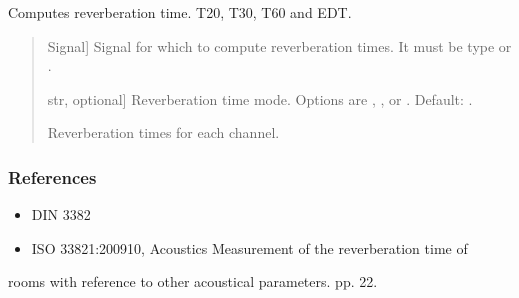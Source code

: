 \documentclass[letterpaper,10pt,english]{sphinxmanual}
\begin{document}
\begin{fulllineitems}
\label{\detokenize{modules/dsptools.room_acoustics:dsptools.room_acoustics.reverb_time}}
\pysigstartsignatures
{}
\pysigstopsignatures
\sphinxAtStartPar
Computes reverberation time. T20, T30, T60 and EDT.
\begin{quote}\begin{description}
\begin{description}
\sphinxlineitem{\sphinxstylestrong{signal}}{[}Signal{]}
\sphinxAtStartPar
Signal for which to compute reverberation times. It must be type
 or .

\sphinxlineitem{\sphinxstylestrong{mode}}{[}str, optional{]}
\sphinxAtStartPar
Reverberation time mode. Options are , ,  or
. Default: .

\end{description}

\begin{description}
\sphinxlineitem{\sphinxstylestrong{reverberation\_times}}{[}\sphinxtitleref{np.ndarray}{]}
\sphinxAtStartPar
Reverberation times for each channel.

\end{description}

\end{description}\end{quote}
\subsubsection*{References}
\begin{itemize}
\item {} 
\sphinxAtStartPar
DIN 3382

\item {} 
\sphinxAtStartPar
ISO 3382\sphinxhyphen{}1:2009\sphinxhyphen{}10, Acoustics \sphinxhyphen{} Measurement of the reverberation time of

\end{itemize}

\sphinxAtStartPar
rooms with reference to other acoustical parameters. pp. 22.

\end{fulllineitems}
\end{document}

